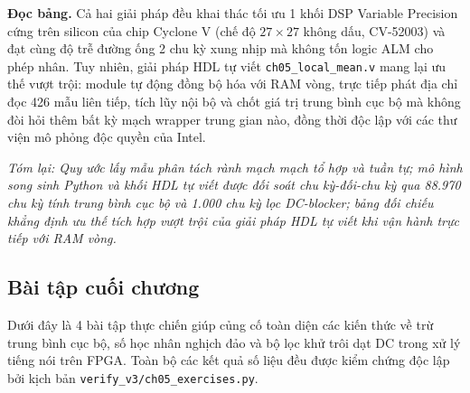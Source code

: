 \textbf{Đọc bảng.} Cả hai giải pháp đều khai thác tối ưu 1 khối DSP Variable Precision cứng trên silicon của chip Cyclone V (chế độ $27 \times 27$ không dấu, CV-52003) và đạt cùng độ trễ đường ống 2 chu kỳ xung nhịp mà không tốn logic ALM cho phép nhân. Tuy nhiên, giải pháp HDL tự viết \texttt{ch05\_local\_mean.v} mang lại ưu thế vượt trội: module tự động đồng bộ hóa với RAM vòng, trực tiếp phát địa chỉ đọc 426 mẫu liên tiếp, tích lũy nội bộ và chốt giá trị trung bình cục bộ mà không đòi hỏi thêm bất kỳ mạch wrapper trung gian nào, đồng thời độc lập với các thư viện mô phỏng độc quyền của Intel.

\textit{Tóm lại: Quy ước lấy mẫu phân tách rành mạch mạch tổ hợp và tuần tự; mô hình song sinh Python và khối HDL tự viết được đối soát chu kỳ-đối-chu kỳ qua 88.970 chu kỳ tính trung bình cục bộ và 1.000 chu kỳ lọc DC-blocker; bảng đối chiếu khẳng định ưu thế tích hợp vượt trội của giải pháp HDL tự viết khi vận hành trực tiếp với RAM vòng.}

\subsection*{Bài tập cuối chương}

Dưới đây là 4 bài tập thực chiến giúp củng cố toàn diện các kiến thức về trừ trung bình cục bộ, số học nhân nghịch đảo và bộ lọc khử trôi dạt DC trong xử lý tiếng nói trên FPGA. Toàn bộ các kết quả số liệu đều được kiểm chứng độc lập bởi kịch bản \texttt{verify\_v3/ch05\_exercises.py}.

